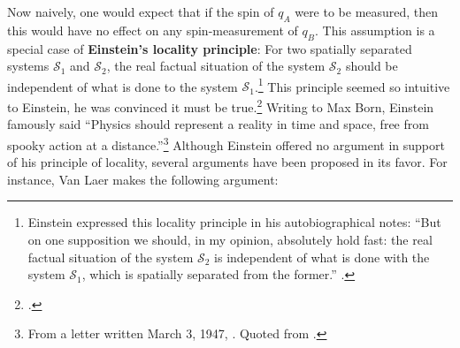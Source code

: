 \documentclass[12pt]{report}
\begin{document}
Now naively, one would expect that if the spin of $q_A$ were to be measured, then this would have no effect on any spin-measurement of $q_B$. This assumption is a special case of \textbf{Einstein's locality principle}:\label{EinsteinLocalityPrinciple} For two spatially separated systems $\mathcal{S}_1$ and $\mathcal{S}_2$, %
%
the real factual situation of the system $\mathcal{S}_2$ should be independent of what is done to the system $\mathcal{S}_1$.\footnote{Einstein expressed this locality principle in his autobiographical notes: ``But on one supposition we should, in my opinion, absolutely hold fast: the real factual situation of the system $\mathcal{S}_2$ is independent of what is done with the system $\mathcal{S}_1$, which is spatially separated from the former.'' \cite[p. 85]{EinsteinLocality}.} This principle seemed so intuitive to Einstein, he was convinced it must be true.\footnote{\cite[449]{IsaacsonWalter2008E:hl}.} Writing to Max Born, Einstein famously said ``Physics should represent a reality in time and space, free from spooky  action at a distance.''\footnote{From a letter written March 3, 1947, \cite[155]{BornMax2005TBl:}. Quoted from \cite[450]{IsaacsonWalter2008E:hl}.} Although Einstein offered no argument in support of his principle of locality, several arguments have been proposed in its favor. For instance,  Van Laer makes the following argument: 
\end{document}
